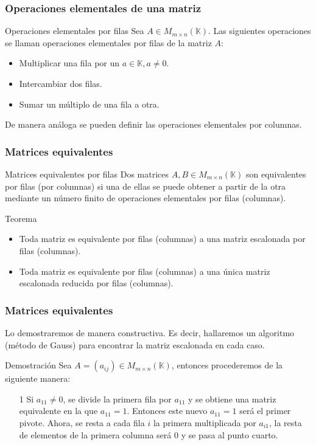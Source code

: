 \documentclass[12pt]{article}
\begin{document}
 \begin{frame}
  \frametitle{Operaciones elementales de una matriz}

 \begin{block}{Operaciones elementales por filas}
Sea $A\in M_{m\times n}(\mathbb{K})$. Las siguientes operaciones se llaman operaciones elementales por filas de la matriz $A$:
\begin{itemize}
\item Multiplicar una fila por un $a\in\mathbb{K}, a\neq 0$.
\item Intercambiar dos filas.
\item Sumar un m\'ultiplo de una fila a otra.

\end{itemize}
\end{block}

De manera an\'aloga se pueden definir las operaciones elementales por columnas.
\end{frame} 
  
  
   \begin{frame}
  \frametitle{Matrices equivalentes}

 \begin{block}{Matrices equivalentes por filas}
Dos matrices $A,B\in M_{m\times n}(\mathbb{K})$ son equivalentes por filas (por columnas) si una de ellas se puede obtener a partir de la otra mediante un n\'umero finito de operaciones elementales por filas (columnas).
\end{block}


 \begin{block}{Teorema}
 \begin{itemize}
\item Toda matriz es equivalente por filas (columnas) a una matriz escalonada por filas (columnas).
\item Toda matriz es equivalente por filas (columnas) a una \'unica matriz escalonada reducida por filas (columnas).
\end{itemize}
\end{block}

\end{frame} 

 \begin{frame}
  \frametitle{Matrices equivalentes}
Lo demostraremos de manera constructiva. Es decir, hallaremos un algoritmo (m\'etodo de Gauss) para encontrar la matriz escalonada en cada caso.
 \begin{block}{Demostraci\'on}
 Sea $A = (a_{ij}) \in M_{m\times n}(\mathbb{K})$, entonces procederemos de la siguiente manera:
\begin{itemize}
\item[1] Si $a_{11}\neq 0$, se divide la primera fila por $a_{11}$ y se obtiene una matriz equivalente en la que $a_{11} = 1$. Entonces este nuevo $a_{11} = 1$ ser\'a el primer pivote. Ahora, se resta a cada fila $i$ la primera multiplicada por $a_{i1}$, la resta de elementos de la primera columna ser\'a 0 y se pasa al punto cuarto.
\end{itemize}
\end{block}
\end{frame} 
\end{document}
